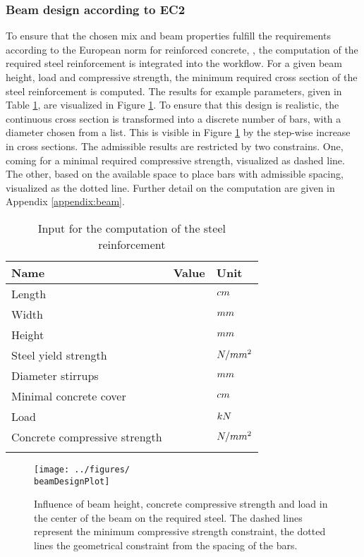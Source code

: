 \subsubsection{Beam design according to EC2}
To ensure that the chosen mix and beam properties fulfill the requirements according to the European norm for reinforced concrete, \cite{DIN1992-1-1}, the computation of the required steel reinforcement is integrated into the workflow.
For a given beam height, load and compressive strength, the minimum required cross section of the steel reinforcement is computed.
The results for example parameters, given in Table \ref{tab:beamdesigninput}, are visualized in Figure \ref{fig:beamdesign}.
To ensure that this design is realistic, the continuous cross section is transformed into a discrete number of bars, with a diameter chosen from a list.
This is visible in Figure \ref{fig:beamdesign} by the step-wise increase in cross sections.
The admissible results are restricted by two constrains.
One, coming for a minimal required compressive strength, visualized as dashed line.
The other, based on the available space to place bars with admissible spacing, visualized as the dotted line.
Further detail on the computation are given in Appendix \ref{appendix:beam}.
\begin{table}[ht]
	\begin{center}
		\begin{minipage}{.9\textwidth}
			\caption{Input for the computation of the steel reinforcement}\label{tab:beamdesigninput}
			\begin{tabular}{lrl}
				\toprule
				Name &  Value&Unit\\
				\midrule
				Length & \beamExSpan &$cm$\\
				Width & \beamExWidth &$mm$\\
				Height& \beamExHeightC &$mm$\\
				Steel yield strength& \beamExYieldStrSteel &$N/mm^2$\\
				Diameter stirrups& \beamExSteelDiaBu &$mm$\\
				Minimal concrete cover& \beamExCoverMin &$cm$\\
				Load& \beamExPointLoadC &$kN$\\
				Concrete compressive strength& \beamExComprStrConcreteC &$N/mm^2$\\
				\botrule
			\end{tabular}
		\end{minipage}
	\end{center}
\end{table}
\begin{figure}[ht]%
	\centering
	\texttt{[image: ../figures/\\beamDesignPlot]}
	\caption{Influence of beam height, concrete compressive strength and load in the center of the beam on the required steel. The dashed lines represent the minimum compressive strength constraint, the dotted lines the geometrical constraint from the spacing of the bars.}\label{fig:beamdesign}
\end{figure}